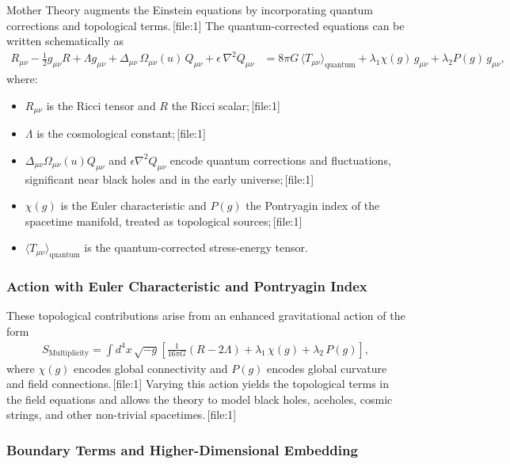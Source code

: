 \documentclass[11pt]{article}
\begin{document}
Mother Theory augments the Einstein equations by incorporating quantum corrections and topological terms.\,[file:1] The quantum-corrected equations can be written schematically as
\begin{align}
R_{\mu\nu}
-\frac{1}{2} g_{\mu\nu} R
+\Lambda g_{\mu\nu}
+\Delta_{\mu\nu}\,\Omega_{\mu\nu}(u)\,Q_{\mu\nu}
+\epsilon\,\nabla^{2} Q_{\mu\nu}
&= 8\pi G \,\langle T_{\mu\nu}\rangle_{\mathrm{quantum}}
+\lambda_1 \chi(g)\,g_{\mu\nu}
+\lambda_2 P(g)\,g_{\mu\nu},
\end{align}
where:
\begin{itemize}
  \item \(R_{\mu\nu}\) is the Ricci tensor and \(R\) the Ricci scalar;\,[file:1]
  \item \(\Lambda\) is the cosmological constant;\,[file:1]
  \item \(\Delta_{\mu\nu}\Omega_{\mu\nu}(u)Q_{\mu\nu}\) and \(\epsilon\nabla^{2}Q_{\mu\nu}\) encode quantum corrections and fluctuations, significant near black holes and in the early universe;\,[file:1]
  \item \(\chi(g)\) is the Euler characteristic and \(P(g)\) the Pontryagin index of the spacetime manifold, treated as topological sources;\,[file:1]
  \item \(\langle T_{\mu\nu}\rangle_{\mathrm{quantum}}\) is the quantum-corrected stress-energy tensor.
\end{itemize}

\subsubsection{Action with Euler Characteristic and Pontryagin Index}

These topological contributions arise from an enhanced gravitational action of the form
\begin{align}
S_{\mathrm{Multiplicity}}
=
\int d^4x\,\sqrt{-g}\left[
\frac{1}{16\pi G}(R-2\Lambda)
+\lambda_1\,\chi(g)+\lambda_2\,P(g)
\right],
\end{align}
where \(\chi(g)\) encodes global connectivity and \(P(g)\) encodes global curvature and field connections.\,[file:1] Varying this action yields the topological terms in the field equations and allows the theory to model black holes, aceholes, cosmic strings, and other non-trivial spacetimes.\,[file:1]

\subsubsection{Boundary Terms and Higher-Dimensional Embedding}
\end{document}
